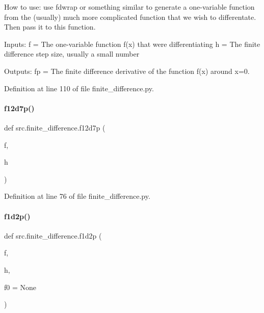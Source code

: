 How to use\+: use fdwrap or something similar to generate a one-\/variable function from the (usually) much more complicated function that we wish to differentate. Then pass it to this function.

Inputs\+: f = The one-\/variable function f(x) that we\textquotesingle{}re differentiating h = The finite difference step size, usually a small number

Outputs\+: fp = The finite difference derivative of the function f(x) around x=0. 

Definition at line 110 of file finite\+\_\+difference.\+py.

\mbox{\label{namespacesrc_1_1finite__difference_a50a4e1556e52c97b3237d9216360f2cf}} 
\paragraph{\texorpdfstring{f12d7p()}{f12d7p()}}
{\footnotesize\ttfamily def src.\+finite\+\_\+difference.\+f12d7p (\begin{DoxyParamCaption}\item[{}]{f,  }\item[{}]{h }\end{DoxyParamCaption})}



Definition at line 76 of file finite\+\_\+difference.\+py.

\mbox{\label{namespacesrc_1_1finite__difference_a0be718f014c3197c50ee4f5fbec9528d}} 
\paragraph{\texorpdfstring{f1d2p()}{f1d2p()}}
{\footnotesize\ttfamily def src.\+finite\+\_\+difference.\+f1d2p (\begin{DoxyParamCaption}\item[{}]{f,  }\item[{}]{h,  }\item[{}]{f0 = {\ttfamily None} }\end{DoxyParamCaption})}



